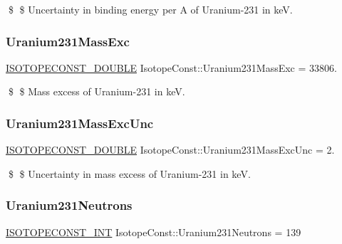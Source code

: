 \$ \$ Uncertainty in binding energy per A of Uranium-\/231 in keV. \mbox{\label{group___isotope_const-_uranium-_u231_ga7b47900cdb47d994b056c62436276da9}} 
\subsubsection{\texorpdfstring{Uranium231\+Mass\+Exc}{Uranium231MassExc}}
{\footnotesize\ttfamily \mbox{\hyperlink{group___isotope_const-_macros_ga8f45a7272ce02c0b4c65c44636ed719a}{I\+S\+O\+T\+O\+P\+E\+C\+O\+N\+S\+T\+\_\+\+D\+O\+U\+B\+LE}} Isotope\+Const\+::\+Uranium231\+Mass\+Exc = 33806.}

\$ \$ Mass excess of Uranium-\/231 in keV. \mbox{\label{group___isotope_const-_uranium-_u231_ga51edc6516dde5ace5b3c74c4db3876ce}} 
\subsubsection{\texorpdfstring{Uranium231\+Mass\+Exc\+Unc}{Uranium231MassExcUnc}}
{\footnotesize\ttfamily \mbox{\hyperlink{group___isotope_const-_macros_ga8f45a7272ce02c0b4c65c44636ed719a}{I\+S\+O\+T\+O\+P\+E\+C\+O\+N\+S\+T\+\_\+\+D\+O\+U\+B\+LE}} Isotope\+Const\+::\+Uranium231\+Mass\+Exc\+Unc = 2.}

\$ \$ Uncertainty in mass excess of Uranium-\/231 in keV. \mbox{\label{group___isotope_const-_uranium-_u231_gaea93227d9b7afbce00d8547b0f328210}} 
\subsubsection{\texorpdfstring{Uranium231\+Neutrons}{Uranium231Neutrons}}
{\footnotesize\ttfamily \mbox{\hyperlink{group___isotope_const-_macros_ga5f18360b3e99483a35c32d789e62621c}{I\+S\+O\+T\+O\+P\+E\+C\+O\+N\+S\+T\+\_\+\+I\+NT}} Isotope\+Const\+::\+Uranium231\+Neutrons = 139}

